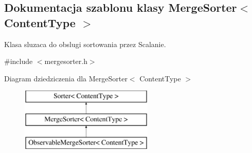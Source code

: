 \hypertarget{class_merge_sorter}{\subsection{Dokumentacja szablonu klasy Merge\-Sorter$<$ Content\-Type $>$}
\label{class_merge_sorter}
}


Klasa sluzaca do obslugi sortowania przez Scalanie.  




{\ttfamily \#include $<$mergesorter.\-h$>$}

Diagram dziedziczenia dla Merge\-Sorter$<$ Content\-Type $>$\begin{figure}[H]
\begin{center}
\leavevmode
\includegraphics[height=3.000000cm]{class_merge_sorter}
\end{center}
\end{figure}
